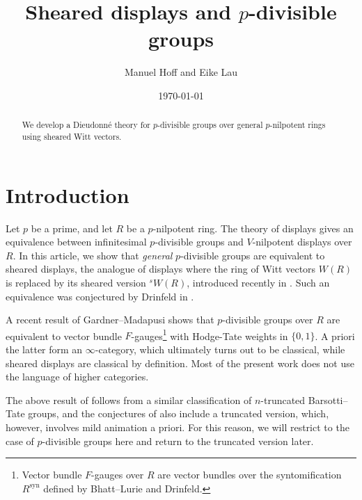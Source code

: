 \documentclass[a4paper,11pt]{amsart}
\theoremstyle{plain}
\theoremstyle{definition}
\theoremstyle{remark}
\numberwithin{equation}{section}
\DeclareMathOperator{\syn}{syn}
\newcommand{\sW}{{}^sW}
\newcommand{\cclearpage}{}%
\begin{document}
\title{Sheared displays and $p$-divisible groups}
\author{Manuel Hoff and Eike Lau}
\date{\today}
\address{Fakult\"{a}t f\"{u}r Mathematik,
Universit\"{a}t Bielefeld, D-33501 Bielefeld}

\begin{abstract}
We develop a Dieudonn\'e theory for $p$-divisible groups over general $p$-nilpotent rings using sheared Witt vectors.
\end{abstract}

\maketitle

\setcounter{tocdepth}{1}
\tableofcontents


\cclearpage
\section{Introduction}

Let $p$ be a prime, and let $R$ be a $p$-nilpotent ring.
The theory of displays gives an equivalence between infinitesimal $p$-divisible groups and $V$-nilpotent displays over $R$. In this article, we show that \emph{general} $p$-divisible groups are equivalent to sheared displays, the analogue of displays where the ring of Witt vectors $W(R)$ is replaced by its sheared version $\sW(R)$, introduced recently in \cite{Drinfeld:Ring-stacks-conjecturally, BMVZ}.  
Such an equivalence was conjectured by Drinfeld in \cite{Drinfeld:Talk-Manin}.

A recent result of Gardner--Madapusi \cite{Gardner-Madapusi} shows that $p$-divisible groups over $R$ are equivalent to vector bundle $F$-gauges\footnote{Vector bundle $F$-gauges over $R$ are vector bundles over the syntomification $R^{\syn}$ defined by Bhatt--Lurie and Drinfeld.} with Hodge-Tate weights in $\{0,1\}$. A priori the latter form an $\infty$-category, which ultimately turns out to be classical, while sheared displays are classical by definition. Most of the present work does not use the language of higher categories.

The above result of \cite{Gardner-Madapusi} follows from a similar classification of $n$-truncated Barsotti--Tate groups, and the conjectures of \cite{Drinfeld:Talk-Manin} also include a truncated version, which, however, involves mild animation a priori. For this reason, we will restrict to the case of $p$-divisible groups here and return to the truncated version later.
\end{document}
